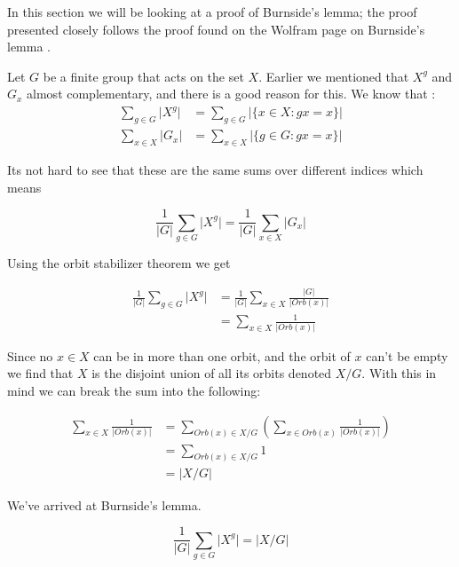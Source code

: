 \documentclass[../main.tex]{subfiles}
\begin{document}
    In this section we will be looking at a proof of Burnside's lemma; the proof presented closely follows the proof found on the Wolfram page on Burnside's lemma \cite{weisstein}.

    Let $G$ be a finite group that acts on the set $X$. Earlier we mentioned that $X^g$ and $G_x$ almost complementary, and there is a good reason for this. We know that
    :
    \begin{align*}
        \sum_{g \in G} \lvert {X^g} \rvert &= \sum_{g \in G} \lvert \{x \in X : gx = x\} \rvert\\
        \sum_{x \in X} \lvert {G_x} \rvert &= \sum_{x \in X} \lvert \{g \in G : gx = x\} \rvert
    \end{align*}
    
    Its not hard to see that these are the same sums over different indices which means
    
    \begin{equation*}
        \frac{1}{\lvert G \rvert} \sum_{g \in G} \lvert {X^g} \rvert = \frac{1}{\lvert G \rvert} \sum_{x \in X} \lvert {G_x} \rvert
    \end{equation*}
    
    Using the orbit stabilizer theorem we get
    
    \begin{equation*}
        \begin{split}
            \frac{1}{\lvert G \rvert} \sum_{g \in G} \lvert {X^g} \rvert & = \frac{1}{\lvert G \rvert} \sum_{x \in X}  \frac{\lvert G \rvert}{\lvert Orb(x) \rvert} \\
        & = \sum_{x \in X}  \frac{1}{\lvert Orb(x) \rvert}
        \end{split}
    \end{equation*}
    
    Since no $x \in X$ can be in more than one orbit, and the orbit of $x$ can't be empty we find that $X$ is the disjoint union of all its orbits denoted $X/G$. With this in mind we can break the sum into the following:
    
    \begin{equation*}
        \begin{split}
            \sum_{x \in X}  \frac{1}{\lvert Orb(x) \rvert} & = \sum_{Orb(x) \in X/G} \left( \sum_{x \in Orb(x)} \frac{1}{\lvert Orb(x) \rvert} \right) \\
        & = \sum_{Orb(x) \in X/G} {1} \\
        & = \lvert X/G \rvert
        \end{split}
    \end{equation*}
    
    We've arrived at Burnside's lemma.
    
    \begin{equation*}
        \frac{1}{\lvert G \rvert} \sum_{g \in G} \lvert {X^g} \rvert = \lvert X/G \rvert
    \end{equation*}

        


    
    
\end{document}
